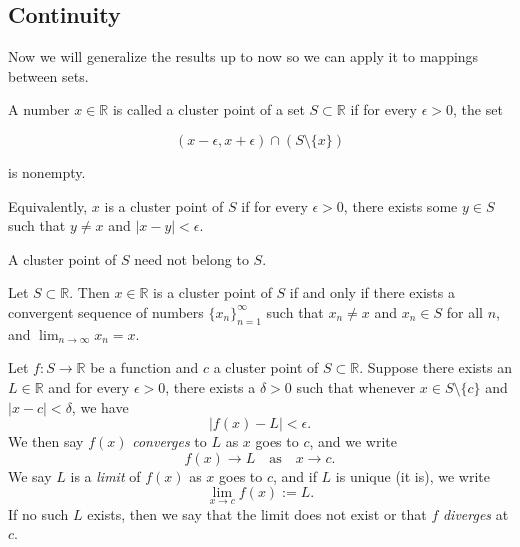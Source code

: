 \documentclass[../main.tex]{subfiles}
\begin{document}
    
    
    
    \subsection{Continuity}
    
    \begin{remark}
    Now we will generalize the results up to now so we can apply it to mappings between sets. 
    \end{remark}
    
    
    
    
    
    
    
    
    \begin{definition}\label{def:cluster_point}
    A number \( x \in \mathbb{R} \) is called a cluster point of a set \( S \subset \mathbb{R} \) if for every \( \epsilon > 0 \), the set  
    
    \[
    (x - \epsilon, x + \epsilon) \cap (S \setminus \{x\})
    \]
    
    is nonempty.  
    
    Equivalently, \( x \) is a cluster point of \( S \) if for every \( \epsilon > 0 \), there exists some \( y \in S \) such that \( y \neq x \) and \( |x - y| < \epsilon \).  
    
    A cluster point of \( S \) need not belong to \( S \).
    \end{definition}
    
    
    \begin{proposition}
        Let $S \subset \mathbb{R}$. Then $x \in \mathbb{R}$ is a cluster point of $S$ if and only if there exists a convergent sequence of numbers $\{x_n\}_{n=1}^{\infty}$ such that $x_n \neq x$ and $x_n \in S$ for all $n$, and 
        \(
        \lim_{n\to\infty} x_n = x.
        \)
    \end{proposition}
    
    
    
    
    \begin{definition}
        Let $f : S \to \mathbb{R}$ be a function and $c$ a cluster point of $S \subset \mathbb{R}$. Suppose there exists an $L \in \mathbb{R}$ and for every $\epsilon > 0$, there exists a $\delta > 0$ such that whenever $x \in S \setminus \{c\}$ and $|x - c| < \delta$, we have
        \[
        |f(x) - L| < \epsilon.
        \]
        We then say $f(x)$ \textit{converges} to $L$ as $x$ goes to $c$, and we write
        \[
        f(x) \to L \quad \text{as} \quad x \to c.
        \]
        We say $L$ is a \textit{limit} of $f(x)$ as $x$ goes to $c$, and if $L$ is unique (it is), we write
        \[
        \lim_{x\to c} f(x) := L.
        \]
        If no such $L$ exists, then we say that the limit does not exist or that $f$ \textit{diverges} at $c$.
        
    \end{definition}
        
\end{document}
